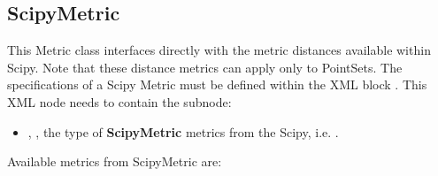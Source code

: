 \subsection{ScipyMetric}
\label{subsection:ScipyMetric}
This Metric class interfaces directly with the metric distances available within Scipy.
Note that these distance metrics can apply only to PointSets. 
The specifications of a Scipy Metric must be defined within the XML block .
This XML node needs to contain the subnode:
\begin{itemize}
  \item {}, , the type of \textbf{ScipyMetric} metrics
    from the Scipy, i.e. .
\end{itemize}
Available metrics from ScipyMetric are:
